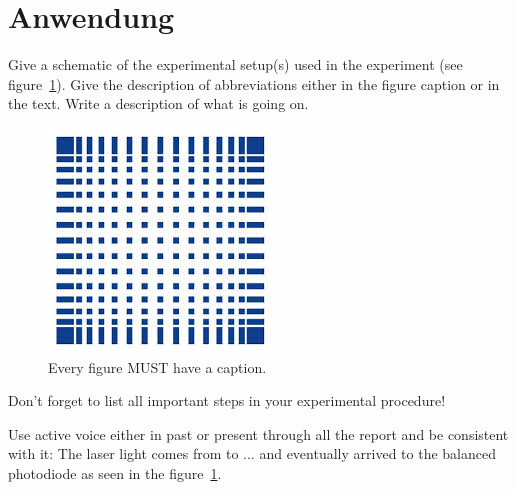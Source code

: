 \documentclass[letterpaper,12pt]{article}
\begin{document}
	
	\section{Anwendung}
	
	Give a schematic of the experimental setup(s) used in the experiment (see
	figure~\ref{fig:samplesetup}). Give the description of  abbreviations
	either in the figure caption or in the text. Write a description of what is
	going on. 
	
	\begin{figure}[ht] 
		\centering \includegraphics[width=0.8\columnwidth]{Images/hsMannheim.jpg}
		\caption{
			\label{fig:samplesetup} %
			Every figure MUST have a caption.
		}
	\end{figure}
	
	Don't forget to list all important steps in your experimental procedure!
	
	Use active voice either in past or present through all the report and be
	consistent with it:
	The laser light comes  from to ... and eventually arrived to the
	balanced photodiode as seen in the figure~\ref{fig:samplesetup}.
	
\end{document}
